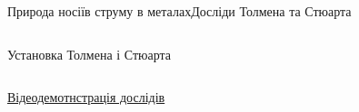 \documentclass[onlytextwidth]{beamer}
\begin{document}
\begin{frame}{Природа носіїв струму в металах}{Досліди Толмена та Стюарта}
\begin{columns}
\begin{column}{0.3\linewidth}
			\begin{block}{}\centering
				Установка Толмена і Стюарта
			\end{block}
		\end{column}
	\end{columns}
	\begin{block}{}
		\href{https://www.youtube.com/watch?v=nVwquffMk44}{\color{blue}Відеодемотнстрація дослідів}
	\end{block}
\end{frame}
\end{document}
